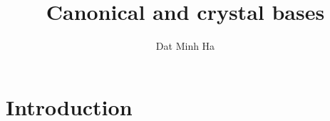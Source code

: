 

\setcounter{section}{-1}





    \title{Canonical and crystal bases}
    
    \author{Dat Minh Ha}
    \maketitle
    
    \begin{abstract}
    
    \end{abstract}
    
    {
    \hypersetup{} 
    \tableofcontents %
    }

    \section{Introduction}
    
    \printbibliography

